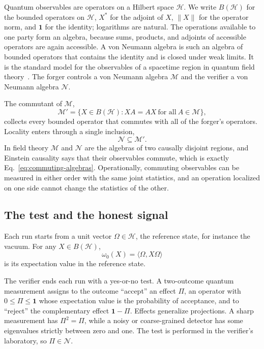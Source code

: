 \documentclass[11pt,a4paper]{article}
\newcommand{\M}{\mathcal{M}}
\newcommand{\N}{\mathcal{N}}
\newcommand{\Hil}{\mathcal{H}}
\begin{document}
Quantum observables are operators on a Hilbert space $\Hil$. We write $B(\Hil)$ for the bounded operators on $\Hil$, $X^*$ for the adjoint of $X$, $\|X\|$ for the operator norm, and $\mathbf{1}$ for the identity; logarithms are natural. The operations available to one party form an algebra, because sums, products, and adjoints of accessible operators are again accessible. A von Neumann algebra is such an algebra of bounded operators that contains the identity and is closed under weak limits. It is the standard model for the observables of a spacetime region in quantum field theory~\cite{haag1964algebraic}. The forger controls a von Neumann algebra $\M$ and the verifier a von Neumann algebra $\N$.

The commutant of $\M$,
\begin{equation*}
\M'=\{X\in B(\Hil):XA=AX\ \text{for all}\ A\in\M\},
\end{equation*}
collects every bounded operator that commutes with all of the forger's operators. Locality enters through a single inclusion,
\begin{equation}
\N\subseteq\M'.
\label{eq:commuting-algebras}
\end{equation}
In field theory $\M$ and $\N$ are the algebras of two causally disjoint regions, and Einstein causality says that their observables commute, which is exactly Eq.~\eqref{eq:commuting-algebras}. Operationally, commuting observables can be measured in either order with the same joint statistics, and an operation localized on one side cannot change the statistics of the other.

\subsection{The test and the honest signal}

Each run starts from a unit vector $\Omega\in\Hil$, the reference state, for instance the vacuum. For any $X\in B(\Hil)$,
\begin{equation*}
\omega_0(X)=\langle\Omega,X\Omega\rangle
\end{equation*}
is its expectation value in the reference state.

The verifier ends each run with a yes-or-no test. A two-outcome quantum measurement assigns to the outcome ``accept'' an effect $\Pi$, an operator with $0\le\Pi\le\mathbf{1}$ whose expectation value is the probability of acceptance, and to ``reject'' the complementary effect $\mathbf{1}-\Pi$. Effects generalize projections. A sharp measurement has $\Pi^2=\Pi$, while a noisy or coarse-grained detector has some eigenvalues strictly between zero and one. The test is performed in the verifier's laboratory, so $\Pi\in\N$.
\end{document}
